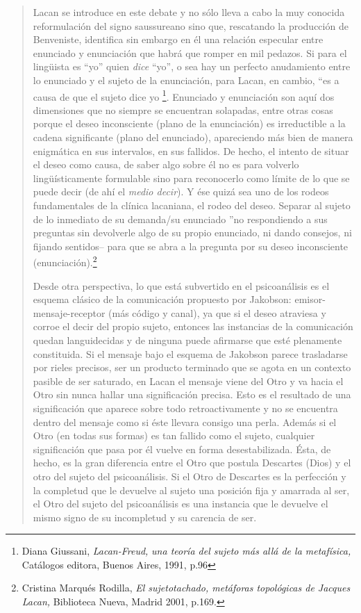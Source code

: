 \begin{quote}
Lacan se introduce en este debate y no sólo lleva a cabo la muy conocida reformulación del signo saussureano sino que, rescatando la producción de Benveniste, identifica sin embargo en él una relación especular entre enunciado y enunciación que habrá que romper en mil pedazos. Si para el lingüista es \enquote{yo} quien \emph{dice} \enquote{yo}, o sea hay un perfecto anudamiento entre lo enunciado y el sujeto de la enunciación, para Lacan, en cambio, \enquote{es a causa de que el sujeto dice yo \footnote{Diana Giussani, \emph{Lacan-Freud,} \emph{una teoría del sujeto más allá de la metafísica,} Catálogos editora, Buenos Aires, 1991, p.96}. Enunciado y enunciación son aquí dos dimensiones que no siempre se encuentran solapadas, entre otras cosas porque el deseo inconsciente (plano de la enunciación) es irreductible a la cadena significante (plano del enunciado), apareciendo más bien de manera enigmática en sus intervalos, en sus fallidos. De hecho, el intento de situar el deseo como causa, de saber algo sobre él no es para volverlo lingüísticamente formulable sino para reconocerlo como límite de lo que se puede decir (de ahí el \emph{medio decir}). Y ése quizá sea uno de los rodeos fundamentales de la clínica lacaniana, el rodeo del deseo. Separar al sujeto de lo inmediato de su demanda/su enunciado }no respondiendo a sus preguntas sin devolverle algo de su propio enunciado, ni dando consejos, ni fijando sentidos-- para que se abra a la pregunta por su deseo inconsciente (enunciación).\footnote{Cristina Marqués Rodilla, \emph{El sujetotachado, metáforas topológicas de Jacques Lacan,} Biblioteca Nueva, Madrid 2001, p.169.}

Desde otra perspectiva, lo que está subvertido en el psicoanálisis es el esquema clásico de la comunicación propuesto por Jakobson: emisor-mensaje-receptor (más código y canal), ya que si el deseo atraviesa y corroe el decir del propio sujeto, entonces las instancias de la comunicación quedan languidecidas y de ninguna puede afirmarse que esté plenamente constituida. Si el mensaje bajo el esquema de Jakobson parece trasladarse por rieles precisos, ser un producto terminado que se agota en un contexto pasible de ser saturado, en Lacan el mensaje viene del Otro y va hacia el Otro sin nunca hallar una significación precisa. Esto es el resultado de una significación que aparece sobre todo retroactivamente y no se encuentra dentro del mensaje como si éste llevara consigo una perla. Además si el Otro (en todas sus formas) es tan fallido como el sujeto, cualquier significación que pasa por él vuelve en forma desestabilizada. Ésta, de hecho, es la gran diferencia entre el Otro que postula Descartes (Dios) y el otro del sujeto del psicoanálisis. Si el Otro de Descartes es la perfección y la completud que le devuelve al sujeto una posición fija y amarrada al ser, el Otro del sujeto del psicoanálisis es una instancia que le devuelve el mismo signo de su incompletud y su carencia de ser.


\end{quote}
